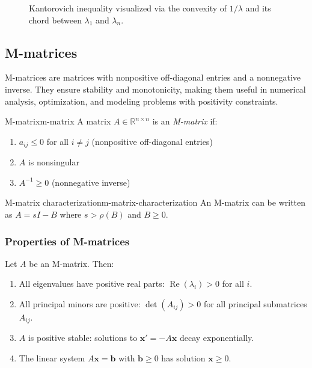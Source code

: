 \documentclass[../../main.tex]{subfiles}
\begin{document}
\begin{figure}[ht]
    \centering
    
    \caption{Kantorovich inequality visualized via the convexity of $1/\lambda$ and its chord between $\lambda_1$ and $\lambda_n$.}
\end{figure}

\subsection{M-matrices}
M-matrices are matrices with nonpositive off-diagonal entries and a nonnegative inverse.
They ensure stability and monotonicity, making them useful in numerical analysis, optimization, and modeling problems with positivity constraints.

\begin{definition}{M-matrix}{m-matrix}
    A matrix $A \in \mathbb{R}^{n \times n}$ is an \emph{M-matrix} if:
    \begin{enumerate}
        \item $a_{ij} \leq 0$ for all $i \neq j$ (nonpositive off-diagonal entries)
        \item $A$ is nonsingular
        \item $A^{-1} \geq 0$ (nonnegative inverse)
    \end{enumerate}
\end{definition}

\begin{corollary}{M-matrix characterization}{m-matrix-characterization}
    An M-matrix can be written as $A = sI - B$ where $s > \rho(B)$ and $B \geq 0$.
\end{corollary}

\subsubsection{Properties of M-matrices}
Let $A$ be an M-matrix. Then:
\begin{enumerate}
    \item All eigenvalues have positive real parts: $\operatorname{Re}(\lambda_i) > 0$ for all $i$.
    \item All principal minors are positive: $\det(A_{ij}) > 0$ for all principal submatrices $A_{ij}$.
    \item $A$ is positive stable: solutions to $\mathbf{x}' = -A\mathbf{x}$ decay exponentially.
    \item The linear system $A\mathbf{x} = \mathbf{b}$ with $\mathbf{b} \geq 0$ has solution $\mathbf{x} \geq 0$.
\end{enumerate}
\end{document}
